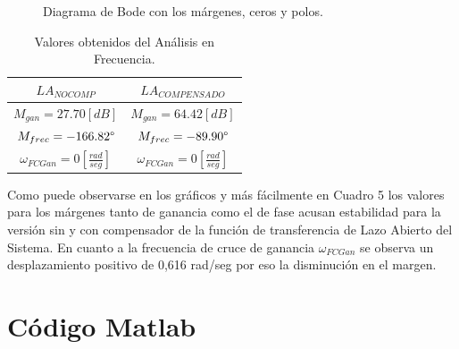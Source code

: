 \documentclass[a4paper,11pt]{article}
\begin{document}
	\begin{figure}[H] %
	\caption{Diagrama de Bode con los márgenes, ceros y polos.}
	\label{fig:bode_margenFymargenG}
	\end{figure}

\begin{table}[h!]
\centering
\caption{Valores obtenidos del Análisis en Frecuencia.}
\begin{tabular}{|c|c|}
\hline
$LA_{NO COMP}$ & $LA_{COMPENSADO}$\tabularnewline
\hline
\hline 
$M_{gan}=27.70[dB]$ & $M_{gan}=64.42[dB]$\tabularnewline
\hline 
$M_{frec}=-166.82\degree $ & $M_{frec}=-89.90\degree $\tabularnewline
\hline 
$\omega_{FCGan}=0[\frac{rad}{seg}]$ & $\omega_{FCGan}=0[\frac{rad}{seg}]$\tabularnewline
\hline
\end{tabular}
\end{table}

Como puede observarse en los gráficos y más fácilmente en Cuadro 5  los valores para los márgenes tanto de ganancia como el de fase acusan estabilidad para la versión sin y con compensador de la función de transferencia de Lazo Abierto del Sistema.
En cuanto a la frecuencia de cruce de ganancia $\omega_{FCGan}$ se observa un desplazamiento positivo de 0,616 rad/seg por eso la disminución en el margen. 

\section{Código Matlab}
\vspace*{5\baselineskip}
\end{document}
